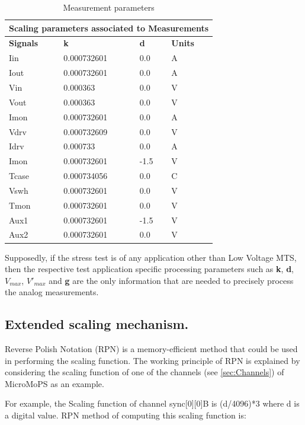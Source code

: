 \begin{table}[ht]
	\centering
	\label{table:Table3}
	\caption{Measurement parameters}
\begin{tabular}{ |p{3cm}||p{3cm}|p{1.5cm}|p{1.5cm}|}
 \hline
 \multicolumn{4}{|c|}{Scaling parameters associated to Measurements} \\
 \hline
 \textbf{Signals}   & \textbf{k}    &\textbf{d}  &\textbf{Units}\\
Iin   &0.000732601   &0.0 &A\\
Iout   &0.000732601   &0.0 &A\\
Vin   &0.000363   &0.0 &V\\
Vout   &0.000363    &0.0 &V\\  	
Imon   &0.000732601   &0.0 &A\\
Vdrv   &0.000732609   &0.0 &V\\
Idrv   &0.000733   &0.0 &A\\
Imon   &0.000732601   &-1.5 &V\\
Tcase   &0.000734056   &0.0 &C\\
Vswh   &0.000732601   &0.0 &V\\
Tmon   &0.000732601   &0.0 &V\\
Aux1   &0.000732601   &-1.5 &V\\
Aux2   &0.000732601   &0.0 &V\\
 \hline
\end{tabular}
\end{table}

Supposedly, if the stress test is of any application other than Low Voltage MTS, then the respective test application specific processing parameters such as \textbf{k}, \textbf{d}, \textbf{${V_{max}}$}, \textbf{${V'_{max}}$} and \textbf{g} are the only information that are needed to precisely process the analog measurements.

\subsection{Extended scaling mechanism.}\label{sec:RPN}   
Reverse Polish Notation (RPN) is a memory-efficient method that could be used in performing the scaling function. 
The working principle of RPN is explained by considering the scaling function of one of the channels (see \cref{sec:Channels}) of MicroMoPS as an example.

For example, the Scaling function of channel sync[0][0]B is (d/4096)*3 where d is a digital value. \acrshort{RPN} method of computing this scaling function is:      

